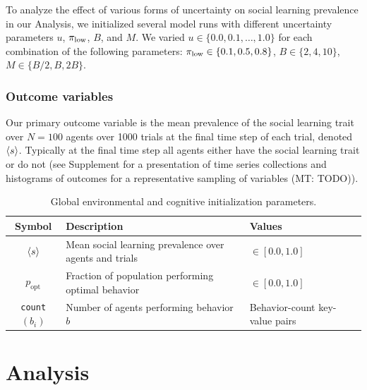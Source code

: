 \documentclass[letterpaper,11.5pt]{scrartcl}
\newcommand{\mt}[1]{{\textcolor{myorange} {({\tiny MT:} #1)}}}
\begin{document}
To analyze the effect of various forms of uncertainty on social learning 
prevalence in our Analysis, we initialized several model runs with
different uncertainty parameters $u$, $\pi_{\mathrm{\mathrm{low}}}$, $B$,
and $M$. We varied $u \in \{0.0, 0.1, \ldots, 1.0\}$ for each combination of
the following parameters:
$\pi_{\mathrm{low}} \in \{0.1, 0.5, 0.8\}$, $B \in \{2, 4, 10\}$, $M \in \{B/2, B, 2B\}$.

\subsubsection{Outcome variables}

Our primary outcome variable is the mean prevalence of the social learning
trait over $N=100$ agents over 1000 trials at the final time step of each trial,
denoted $\langle s \rangle$.
Typically at the final time step all agents either have the social learning
trait or do not (see Supplement for a presentation of time series collections
and histograms of outcomes for
a representative sampling of variables \mt{TODO}).

\begin{table}[h]
    \caption{Global environmental and cognitive initialization parameters.}
    \label{tab:modelParameters}
    \centering \hspace{-3em}
    \begin{tabular}{cp{4.0in}l} \toprule

        Symbol & Description & Values \\ 

        \midrule  

        $\langle s \rangle$ & Mean social learning prevalence over agents and trials
                  & $\in [0.0, 1.0]$ \\

        $p_{\text{opt}}$ & Fraction of population performing optimal behavior
                         & $\in [0.0, 1.0]$ \\

        \texttt{count}$(b_i)$ & Number of agents performing behavior $b$ 
                              & Behavior-count key-value pairs\\
        \bottomrule
    \end{tabular}
\end{table}


\section{Analysis}
\end{document}
